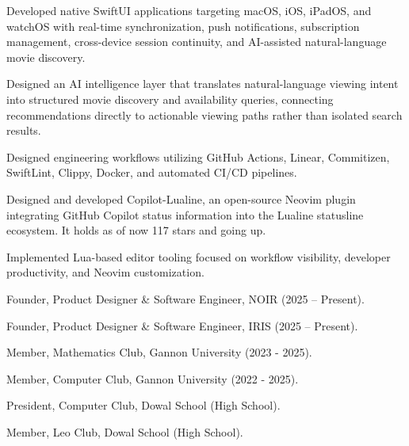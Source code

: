 \documentclass{../../../Styles/MS-Style}
\begin{document}
\begin{Form}
\begin{listBlock}
		\generalItem
		Developed native SwiftUI applications targeting macOS, iOS, iPadOS,
		and watchOS with real-time synchronization, push notifications,
		subscription management, cross-device session continuity,
		and AI-assisted natural-language movie discovery.

		\generalItem
		Designed an AI intelligence layer that translates natural-language viewing intent
		into structured movie discovery and availability queries, connecting recommendations
		directly to actionable viewing paths rather than isolated search results.

		\generalItem
		Designed engineering workflows utilizing GitHub Actions, Linear,
		Commitizen, SwiftLint, Clippy, Docker, and automated CI/CD pipelines.

	\end{listBlock}


	\begin{listBlock}

		\generalItem
		Designed and developed Copilot-Lualine, an open-source Neovim plugin
		integrating GitHub Copilot status information into the Lualine statusline ecosystem. It holds
		as of now 117 stars and going up.\cite{CopilotLualine}

		\generalItem
		Implemented Lua-based editor tooling focused on workflow visibility,
		developer productivity, and Neovim customization.

	\end{listBlock}

	\sectionTitle{LEADERSHIP \& ORGANIZATIONS}

	\begin{listBlock}

		\generalItem
		Founder, Product Designer \& Software Engineer,
		NOIR (2025 -- Present).

		\generalItem
		Founder, Product Designer \& Software Engineer,
		IRIS (2025 -- Present).

		\generalItem
		Member, Mathematics Club,
        Gannon University (2023 - 2025).

		\generalItem
		Member, Computer Club,
        Gannon University (2022 - 2025).

        \generalItem
        President, Computer Club,
        Dowal School (High School).

		\generalItem
		Member, Leo Club,
        Dowal School (High School).

	\end{listBlock}


\end{Form}
\end{document}
